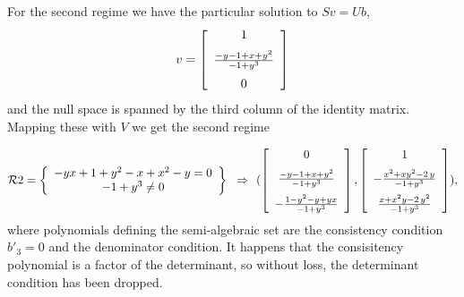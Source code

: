 \documentclass[10pt]{article}
\begin{document}
For the second regime we have the particular solution to $Sv = Ub$,  
\[v = 
\left [\begin {array}{c} 1\\\noalign{\medskip}
\frac {-y-1+x+y^2}{-1+{y}^{3}}\\\noalign{\medskip}
0\end {array}\right ]
\]
and the null space is spanned by the third column of the identity matrix.
Mapping these with $V$ we get the second regime


%
%
\[ \RR2 = 
\breg -yx+1+{y}^{2}-x+{x}^{2}-y=0\\
-1+{y}^{3}\neq 0 \ereg \implies
(\left [\begin {array}{c} 0\\\noalign{\medskip}{\frac {-y-1+x+{y}^{2}}{-
1+{y}^{3}}}\\\noalign{\medskip}-{\frac {1-{y}^{2}-y+yx}{-1+{y}^{3}}}
\end {array}\right ],
\left [\begin {array}{c} 1\\\noalign{\medskip}-{\frac {{x}^{2}+x{y}^{2}
-2\,y}{-1+{y}^{3}}}\\\noalign{\medskip}{\frac {x+{x}^{2}y-2\,{y}^{2}}{-
1+{y}^{3}}}\end {array}\right ]
),
\]
where polynomials defining the semi-algebraic set are the consistency
condition $b'_3 = 0$ and the denominator condition.
It happens that the consisitency polynomial is a factor of the determinant, so without
loss, the determinant condition has been dropped.
\end{document}
